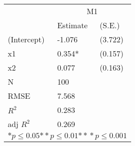\begin{tabular}{*{3}{l}}
\hline
                  & \multicolumn{2}{c}{M1}   \tabularnewline
                   &Estimate  &(S.E.)  \tabularnewline
 \hline
 \hline
   (Intercept)     &-1.076   &   (3.722) \tabularnewline
   x1              &0.354*   &   (0.157) \tabularnewline
   x2              &0.077   &   (0.163) \tabularnewline
 \hline
 N                 &100       &        \tabularnewline
 RMSE             &7.568         & \tabularnewline
 $R^2$             &0.283         & \tabularnewline
 adj $R^2$         &0.269         & \tabularnewline
 \hline
\hline
 
 \multicolumn{3}{c}{${*  p}\le 0.05$${*\!\!*  p}\le 0.01$${*\!\!*\!\!*  p}\le 0.001$}\tabularnewline
 \end{tabular}